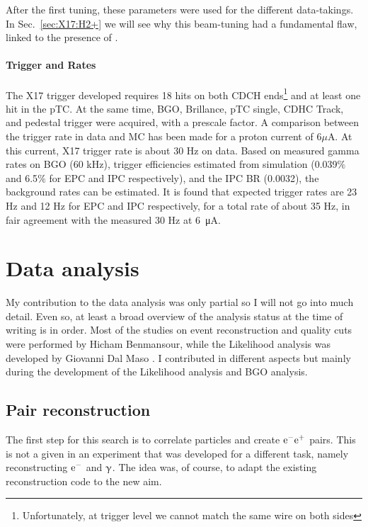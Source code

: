 \begin{refsection}
        \noindent
        After the first tuning, these parameters were used for the different data-takings. 
        In Sec.~\ref{sec:X17:H2+} we will see why this beam-tuning had a fundamental flaw, linked to the presence of .

        \paragraph{Trigger and Rates}
        The X17 trigger developed requires 18 hits on both CDCH ends\footnote{Unfortunately, at trigger level we cannot match the same wire on both sides} and at least one hit in the pTC. 
        At the same time, BGO, Brillance, pTC single, CDHC Track, and pedestal trigger were acquired, with a prescale factor. 
        A comparison between the trigger rate in data and MC has been made for a proton current of 6$\mu$A. 
        At this current, X17 trigger rate is about 30 Hz on data.
        Based on measured gamma rates on BGO (60 kHz), trigger efficiencies estimated from simulation (0.039$\%$ and 6.5$\%$ for EPC and IPC respectively), and the IPC BR (0.0032), the background rates can be estimated. 
        It is found that expected trigger rates are 23 Hz and 12 Hz for EPC and IPC respectively, for a total rate of about 35 Hz, in fair agreement with the measured 30 Hz at \SI{6}{\micro\ampere}.
        
\section{Data analysis}
    My contribution to the data analysis was only partial so I will not go into much detail. 
    Even so, at least a broad overview of the analysis status at the time of writing is in order.
    Most of the studies on event reconstruction and quality cuts were performed by Hicham Benmansour, while the Likelihood analysis was developed by Giovanni Dal Maso \cite{Giovanni}. 
    I contributed in different aspects but mainly during the development of the Likelihood analysis and BGO analysis.

    \subsection{Pair reconstruction}
        The first step for this search is to correlate particles and create $\text{e}^- \text{e}^+$ pairs. 
        This is not a given in an experiment that was developed for a different task, namely reconstructing $\text{e}^-$ and $\upgamma$. 
        The idea was, of course, to adapt the existing reconstruction code to the new aim.
        

\end{refsection}
